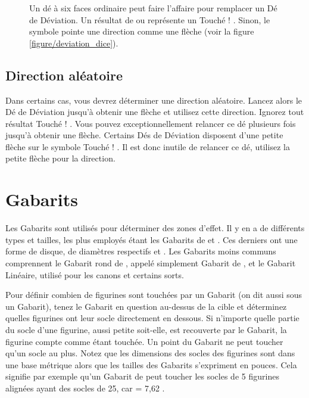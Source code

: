 \begin{figure}[!htbp]
\begin{minipage}[c]{0.67\textwidth}
\vspace*{10pt}
\subsubsection{}

Un dé à six faces ordinaire peut faire l'affaire pour remplacer un Dé de Déviation. Un résultat de  ou  représente un \og Touché ! \fg . Sinon, le symbole  pointe une direction comme une flèche (voir la figure \ref{figure/deviation_dice}).
\end{minipage}
\end{figure}

\subsection{Direction aléatoire}

Dans certains cas, vous devrez déterminer une direction aléatoire. Lancez alors le Dé de Déviation jusqu'à obtenir une flèche et utilisez cette direction. Ignorez tout résultat \og Touché ! \fg{}. Vous pouvez exceptionnellement relancer ce dé plusieurs fois jusqu'à obtenir une flèche. Certains Dés de Déviation disposent d'une petite flèche sur le symbole \og Touché ! \fg{}. Il est donc inutile de relancer ce dé, utilisez la petite flèche pour la direction.

\section{Gabarits}

Les Gabarits sont utilisés pour déterminer des zones d'effet. Il y en a de différents types et tailles, les plus employés étant les Gabarits de  et . Ces derniers ont une forme de disque, de diamètres respectifs  et . Les Gabarits moins communs comprennent le Gabarit rond de , appelé simplement Gabarit de , et le Gabarit Linéaire, utilisé pour les canons et certains sorts.

Pour définir combien de figurines sont touchées par un Gabarit (on dit aussi sous un Gabarit), tenez le Gabarit en question au-dessus de la cible et déterminez quelles figurines ont leur socle directement en dessous. Si n'importe quelle partie du socle d'une figurine, aussi petite soit-elle, est recouverte par le Gabarit, la figurine compte comme étant touchée. Un point du Gabarit ne peut toucher qu'un socle au plus. Notez que les dimensions des socles des figurines sont dans une base métrique alors que les tailles des Gabarits s'expriment en pouces. Cela signifie par exemple qu'un Gabarit de  peut toucher les socles de 5 figurines alignées ayant des socles de \unit{25}{\milli\meter}, car  = 7,62 {\centi\meter}.

